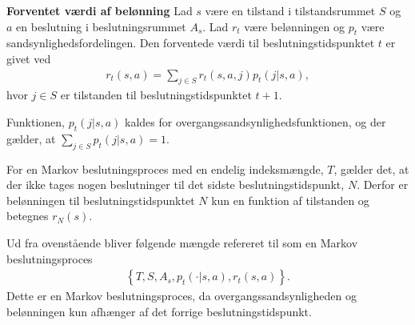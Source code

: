 \begin{defn} \textbf{Forventet værdi af belønning}
\newline
Lad $s$ være en tilstand i tilstandsrummet $S$ og $a$ en beslutning i beslutningsrummet $A_s$. Lad $r_t$ være belønningen og $p_t$ være sandsynlighedsfordelingen.
Den forventede værdi til beslutningstidspunktet $t$ er givet ved\\
\begin{align*}
    r_t(s,a)=\sum_{j\in S} r_t(s,a,j)p_t(j | s,a),
\end{align*}
hvor $j \in S$ er tilstanden til beslutningstidspunktet $t+1$.
\end{defn}



Funktionen, $p_t(j|s,a)$ kaldes for overgangssandsynlighedsfunktionen, og der gælder, at $\sum_{j\in S} p_t(j|s,a)=1$.


For en Markov beslutningsproces med en endelig indeksmængde, $T$, gælder det, at der ikke tages nogen beslutninger til det sidste beslutningstidspunkt, $N$. Derfor er belønningen til beslutningstidspunktet $N$ kun en funktion af tilstanden og betegnes $r_N(s)$.

Ud fra ovenstående bliver følgende mængde refereret til som en Markov beslutningsproces
%
\begin{align*}
    \left\{T, S, A_s, p_t(\cdot | s,a), r_t(s,a)\right\}.
 \end{align*}
Dette er en Markov beslutningsproces, da overgangssandsynligheden og belønningen kun afhænger af det forrige beslutningstidspunkt. 







